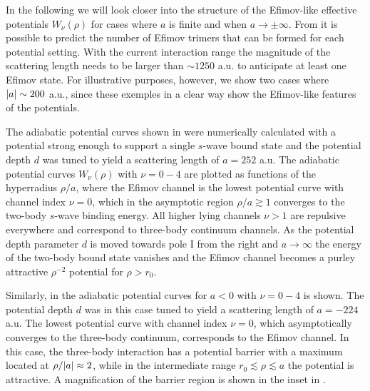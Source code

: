 In the following we will look closer into the structure of the Efimov-like effective potentials $W_{\nu}(\rho)$ for cases where $a$ is finite and when $a \rightarrow \pm \infty$. From  it is possible to predict the number of Efimov trimers that can be formed for each potential setting. With the current interaction range the magnitude of the scattering length needs to be larger than $\sim 1250$ a.u. to anticipate at least one Efimov state. For illustrative purposes, however, we show two cases where $\lvert a\rvert \sim 200$ a.u., since these exemples in a clear way show the Efimov-like features of the potentials.     

The adiabatic potential curves shown in  were numerically calculated with a potential strong enough to support a single $s$-wave bound state and the potential depth $d$ was tuned to yield a scattering length of $a=252$ a.u. The adiabatic potential curves $W_{\nu}(\rho)$ with $\nu = 0-4$ are plotted as functions of the hyperradius $\rho/a$, where the Efimov channel is the lowest potential curve with channel index $\nu = 0$, which in the asymptotic region $\rho/a\gtrsim1$ converges to the two-body $s$-wave binding energy. All higher lying channels $\nu>1$ are repulsive everywhere and correspond to three-body continuum channels. As the potential depth parameter $d$ is moved towards pole $\mathrm{I}$ from the right and $a \rightarrow \infty$ the energy of the two-body bound state vanishes and the Efimov channel becomes a purley attractive $\rho^{-2}$ potential for $\rho>r_0$. 

Similarly, in  the adiabatic potential curves for $a<0$ with $\nu = 0-4$ is shown. The potential depth $d$ was in this case tuned to yield a scattering length of $a=-224$ a.u. The lowest potential curve with channel index $\nu = 0$, which asymptotically converges to the three-body continuum, corresponds to the Efimov channel. In this case, the three-body interaction has a potential barrier with a maximum located at $\rho/\lvert a\rvert \approx 2$, while in the intermediate range $r_0 \lesssim \rho \lesssim a$ the potential is attractive. A magnification of the barrier region is shown in the inset in . 

